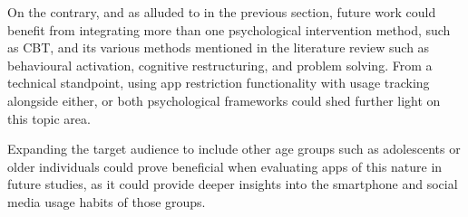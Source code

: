 \documentclass[12pt]{article}
\begin{document}
On the contrary, and as alluded to in the previous section, future work could benefit from integrating more than one psychological intervention method, such as CBT, and 
its various methods mentioned in the literature review such as behavioural activation, cognitive restructuring, and problem solving. From a technical standpoint, using
app restriction functionality with usage tracking alongside either, or both psychological frameworks could shed further light on this topic area.\newline

Expanding the target audience to include other age groups such as adolescents or older individuals could prove beneficial when evaluating apps of this nature in future 
studies, as it could provide deeper insights into the smartphone and social media usage habits of those groups.




\newpage
{}
\printbibliography

\newpage
\end{document}
